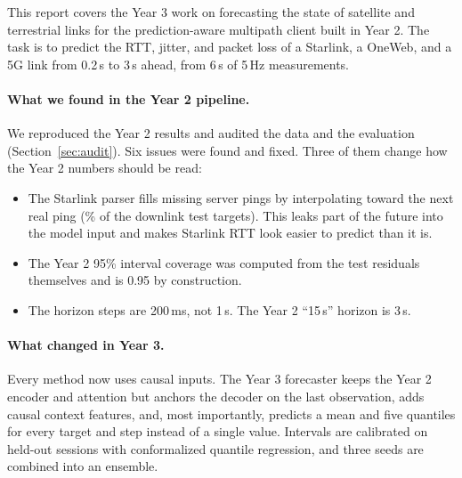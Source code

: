 This report covers the Year 3 work on forecasting the state of satellite and terrestrial links for the prediction-aware multipath client built in Year 2. The task is to predict the RTT, jitter, and packet loss of a Starlink, a OneWeb, and a 5G link from 0.2\,s to 3\,s ahead, from 6\,s of 5\,Hz measurements.

\paragraph{What we found in the Year 2 pipeline.} We reproduced the Year 2 results and audited the data and the evaluation (Section~\ref{sec:audit}). Six issues were found and fixed. Three of them change how the Year 2 numbers should be read:
\begin{itemize}[leftmargin=*]
  \item The Starlink parser fills missing server pings by interpolating toward the next real ping (\InterpFracSLDL\% of the downlink test targets). This leaks part of the future into the model input and makes Starlink RTT look easier to predict than it is.
  \item The Year 2 95\% interval coverage was computed from the test residuals themselves and is 0.95 by construction.
  \item The horizon steps are 200\,ms, not 1\,s. The Year 2 ``15\,s'' horizon is 3\,s.
\end{itemize}

\paragraph{What changed in Year 3.} Every method now uses causal inputs. The Year 3 forecaster keeps the Year 2 encoder and attention but anchors the decoder on the last observation, adds causal context features, and, most importantly, predicts a mean and five quantiles for every target and step instead of a single value. Intervals are calibrated on held-out sessions with conformalized quantile regression, and three seeds are combined into an ensemble.

